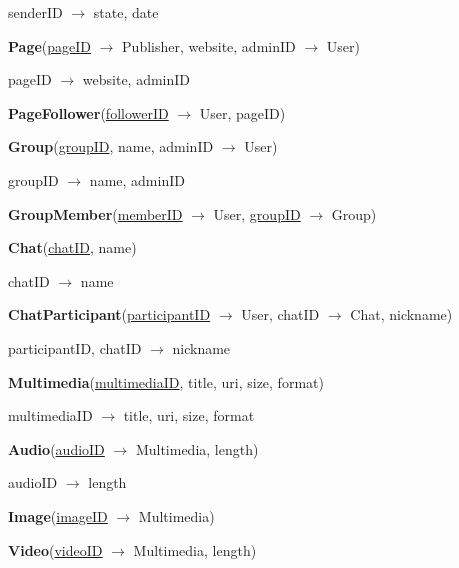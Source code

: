 \documentclass[12pt]{report}
\begin{document}
senderID $\rightarrow$ state, date

\vspace{2mm}

\textbf{Page}(\underline{pageID} $\rightarrow$ Publisher, website, adminID $\rightarrow$ User)

pageID $\rightarrow$ website, adminID

\vspace{2mm}

\textbf{PageFollower}(\underline{followerID} $\rightarrow$ User, pageID)

\vspace{2mm}

\textbf{Group}(\underline{groupID}, name, adminID $\rightarrow$ User)

groupID $\rightarrow$ name, adminID

\vspace{2mm}

\textbf{GroupMember}(\underline{memberID} $\rightarrow$ User, \underline{groupID} $\rightarrow$ Group)

\vspace{2mm}

\textbf{Chat}(\underline{chatID}, name)

chatID $\rightarrow$ name

\vspace{2mm}

\textbf{ChatParticipant}(\underline{participantID} $\rightarrow$ User, chatID $\rightarrow$ Chat, nickname)

participantID, chatID $\rightarrow$ nickname

\vspace{2mm}

\textbf{Multimedia}(\underline{multimediaID}, title, uri, size, format)

multimediaID $\rightarrow$ title, uri, size, format

\vspace{2mm}

\textbf{Audio}(\underline{audioID} $\rightarrow$ Multimedia, length)

audioID $\rightarrow$ length

\vspace{2mm}

\textbf{Image}(\underline{imageID} $\rightarrow$ Multimedia)

\vspace{2mm}

\textbf{Video}(\underline{videoID} $\rightarrow$ Multimedia, length)
\end{document}
